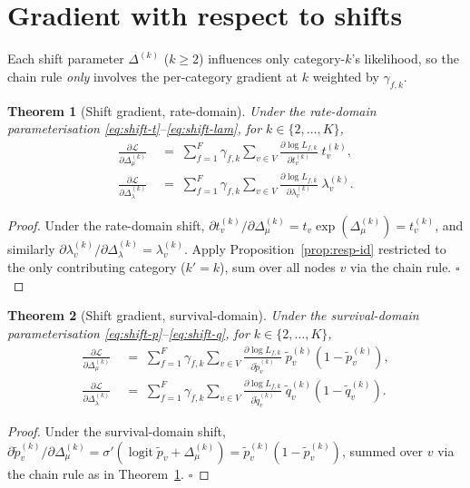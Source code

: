 \documentclass[11pt]{article}
\newcommand{\dup}{\lambda}
\newcommand{\loss}{\mu}
\newcommand{\edgelen}{t}
\newcommand{\survp}{\tilde p}
\newcommand{\survq}{\tilde q}
\newcommand{\Ll}{\mathcal{L}}
\DeclareMathOperator{\logit}{logit}
\newtheorem{theorem}{Theorem}
\theoremstyle{definition}
\begin{document}
\section{Gradient with respect to shifts}
\label{sec:shift-grad}

Each shift parameter $\Delta^{(k)}$ ($k \ge 2$) influences only
category-$k$'s likelihood, so the chain rule \emph{only} involves
the per-category gradient at $k$ weighted by
$\gamma_{f,k}$.

\begin{theorem}[Shift gradient, rate-domain]\label{thm:shift-grad-rate}
Under the rate-domain parameterisation
\eqref{eq:shift-t}--\eqref{eq:shift-lam}, for $k\in\{2,\dots,K\}$,
\begin{align}
\frac{\partial \Ll}{\partial \Delta_\loss^{(k)}}
&\;=\;
\sum_{f=1}^F \gamma_{f,k} \sum_{v\in V}
   \frac{\partial \log L_{f,k}}{\partial \edgelen^{(k)}_v}\; \edgelen^{(k)}_v,
\label{eq:shift-loss-grad-rate}\\
\frac{\partial \Ll}{\partial \Delta_\dup^{(k)}}
&\;=\;
\sum_{f=1}^F \gamma_{f,k} \sum_{v\in V}
   \frac{\partial \log L_{f,k}}{\partial \dup^{(k)}_v}\; \dup^{(k)}_v.
\label{eq:shift-dup-grad-rate}
\end{align}
\end{theorem}
\begin{proof}
Under the rate-domain shift,
$\partial \edgelen^{(k)}_v / \partial \Delta_\loss^{(k)} = \edgelen_v \exp(\Delta_\loss^{(k)}) = \edgelen^{(k)}_v$,
and similarly $\partial \dup^{(k)}_v / \partial \Delta_\dup^{(k)} = \dup^{(k)}_v$.
Apply Proposition~\ref{prop:resp-id} restricted to the only
contributing category ($k'=k$), sum over all nodes $v$ via the chain
rule. $\square$
\end{proof}

\begin{theorem}[Shift gradient, survival-domain]\label{thm:shift-grad-surv}
Under the survival-domain parameterisation
\eqref{eq:shift-p}--\eqref{eq:shift-q}, for $k\in\{2,\dots,K\}$,
\begin{align}
\frac{\partial \Ll}{\partial \Delta_\loss^{(k)}}
&\;=\;
\sum_{f=1}^F \gamma_{f,k} \sum_{v\in V}
   \frac{\partial \log L_{f,k}}{\partial \survp^{(k)}_v}\;
   \survp^{(k)}_v(1 - \survp^{(k)}_v),
\label{eq:shift-loss-grad-surv}\\
\frac{\partial \Ll}{\partial \Delta_\dup^{(k)}}
&\;=\;
\sum_{f=1}^F \gamma_{f,k} \sum_{v\in V}
   \frac{\partial \log L_{f,k}}{\partial \survq^{(k)}_v}\;
   \survq^{(k)}_v(1 - \survq^{(k)}_v).
\label{eq:shift-dup-grad-surv}
\end{align}
\end{theorem}
\begin{proof}
Under the survival-domain shift,
$\partial \survp^{(k)}_v / \partial \Delta_\loss^{(k)}
= \sigma'(\logit\survp_v + \Delta_\loss^{(k)})
= \survp^{(k)}_v (1 - \survp^{(k)}_v)$,
summed over $v$ via the chain rule as in
Theorem~\ref{thm:shift-grad-rate}. $\square$
\end{proof}
\end{document}

